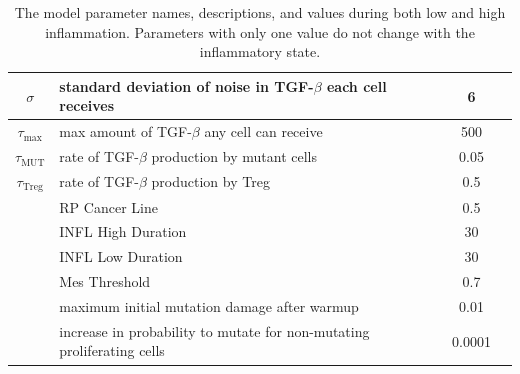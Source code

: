 \documentclass[11pt, a4paper, preprint]{article}
\begin{document}
\begin{table}[H]
\begin{center}
\begin{tabular}{|| c | p{7cm} | c | c ||}
  \hline
  $\sigma$ & standard deviation of noise in TGF-$\beta$ each cell receives & 6 & \\
  \hline
 $\tau_\text{max}$ & max amount of TGF-$\beta$ any cell can receive & 500 &\\
  \hline 
 $\tau_\text{MUT}$ & rate of TGF-$\beta$ production by mutant cells & 0.05 & \\
  \hline
 $\tau_\text{Treg}$ & rate of TGF-$\beta$ production by Treg & 0.5 & \\
  \hline
  & RP Cancer Line  & 0.5 &  \\ 
 \hline
&  INFL High Duration & 30&   \\
 \hline
 & INFL Low Duration &30 &   \\
 \hline
& Mes Threshold & 0.7 &    \\
 \hline
  & maximum initial mutation damage after warmup  & 0.01 &\\
  \hline
  & increase in probability to mutate for non-mutating proliferating cells & 0.0001 & \\
  \hline
\end{tabular}
  \caption{The model parameter names, descriptions, and values during both low and high inflammation. Parameters with only one value do not change with the inflammatory state.}
\end{center}
\end{table}
\end{document}
